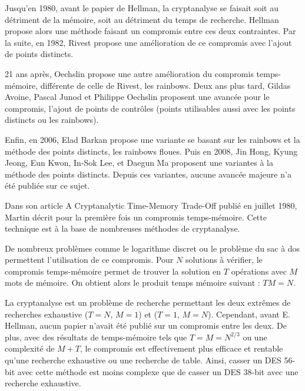 

		Jusqu'en 1980, avant le papier de Hellman\cite{ehellman}, la cryptanalyse se faisait soit au détriment de la mémoire, soit au détriment du temps de recherche. Hellman propose alors une méthode faisant un compromis entre ces deux contraintes. Par la suite, en 1982, Rivest\cite{Rivest} propose une amélioration de ce compromis avec l'ajout de points distincts.

		\bigskip

		21 ans après, Oechslin\cite{Oech03} propose une autre amélioration du compromis temps-mémoire, différente de celle de Rivest, les \glspl{rainbow}. Deux ans plus tard, Gildas Avoine, Pascal Junod et Philippe Oechslin\cite{checkpoints} proposent une avancée pour le compromis, l'ajout de points de contrôles (points utilisables aussi avec les points distincts ou les \glspl{rainbow}).

		\bigskip

		Enfin, en 2006, Elad Barkan propose une variante se basant sur les \glspl{rainbow} et la méthode des points distincts\cite{fuzzy}, les \glspl{rainbow} floues. Puis en 2008, Jin Hong, Kyung Jeong, Eun Kwon, In-Sok Lee, et Daegun Ma proposent une variantes à la méthode des points distincts. Depuis ces variantes, aucune avancée majeure n'a été publiée sur ce sujet.


		Dans son article \og{}A Cryptanalytic Time-Memory Trade-Off\fg{}\cite{ehellman} publié en juillet 1980, Martin  décrit pour la première fois un compromis temps-mémoire. Cette technique est à la base de nombreuses méthodes de cryptanalyse.

		\bigskip

		De nombreux problèmes comme le logarithme discret ou le problème du sac à dos permettent l'utilisation de ce compromis. Pour $N$ solutions à vérifier, le compromis temps-mémoire permet de trouver la solution en $T$ opérations avec $M$ mots de mémoire. On obtient alors le produit temps mémoire suivant : $TM = N$.

		\bigskip

		La cryptanalyse est un problème de recherche permettant les deux extrêmes de recherches exhaustive ($T=N$, $M=1$) et ($T=1$, $M=N$). Cependant, avant E. Hellman\cite{ehellman}, aucun papier n'avait été publié sur un compromis entre les deux. De plus, avec des résultats de temps-mémoire tels que $T = M = N^{2/3}$ ou une complexité de $M + T$, le compromis est effectivement plus efficace et rentable qu'une recherche exhaustive ou une recherche de table. Ainsi, casser un DES 56-bit avec cette méthode est moins complexe que de casser un DES 38-bit avec une recherche exhaustive.

